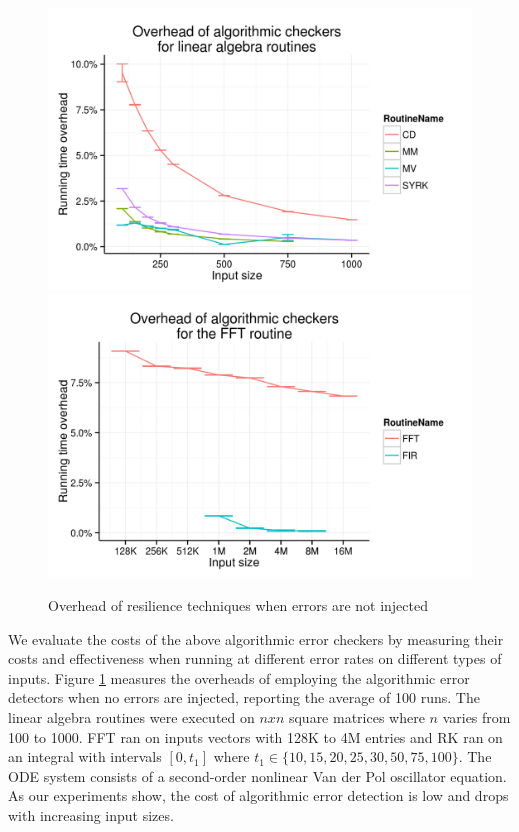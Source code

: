 \documentclass{sig-alternate}
\begin{document}
\begin{figure}[ht!]
\centering
\includegraphics[width=1.00\columnwidth]{figs/4_1_1_Exp1_linalg}
\includegraphics[width=1.00\columnwidth]{figs/4_1_1_Exp1_fft}
\caption{Overhead of resilience techniques when errors are not injected}
\label{fig:routine_detect_ovhd}
\end{figure}

We evaluate the costs of the above algorithmic error checkers by measuring their costs and effectiveness when running at different error rates on different types of inputs.
Figure \ref{fig:routine_detect_ovhd} measures the overheads of employing the algorithmic error detectors when no errors are injected, reporting the average of 100 runs.
The linear algebra routines were executed on $nxn$ square matrices where $n$ varies from 100 to 1000.
FFT ran on inputs vectors with 128K to 4M entries and RK ran on an integral with intervals $[0, t_1]$ where $t_1 \in \{10, 15, 20, 25, 30, 50, 75, 100\}$. The ODE system consists of a second-order nonlinear Van der Pol oscillator equation.
As our experiments show, the cost of algorithmic error detection is low and drops with increasing input sizes.
\end{document}
